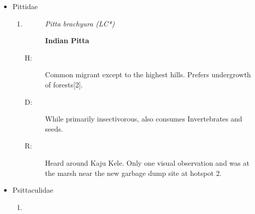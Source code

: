 \begin{itemize}
\begin{enumerate}
\begin{description}
\item[D: ]%
insectivorous woodpecker. Diet consists primarily of ants, beetles, and their larvae. Also known to consume small fruits and nectar.%
\item[R: ]%
Inside Kaju Kele and around the Department of Civil Engineering%
\end{description}%
\item%
\begin{description}%
\item[]%
\textit{Dinopium psarodes (LC)}%
\item[]%
\textbf{Red{-}Backed Flameback}%
\end{description}%
\begin{description}%
\item[H: ]%
Fairly common breeding resident in the southern part of the country. Forests, coconut plantations and trees in open country are the areas where can be easily observed{[}2{]}.%
\item[D: ]%
Primary diet consists of larvae and pupae of ants. Consumes invertebrates such as spiders, caterpillars, weevils, and beetles.%
\item[R: ]%
Kaju kele,Boat yard, wooded areas around the steel building, and Lagaan.%
\end{description}%
\end{enumerate}%
\item%
Pittidae%
\begin{enumerate}%
\item%
\begin{description}%
\item[]%
\textit{Pitta brachyura (LC*)}%
\item[]%
\textbf{Indian Pitta}%
\end{description}%
\begin{description}%
\item[H: ]%
Common migrant except to the highest hills. Prefers undergrowth of forests{[}2{]}.%
\item[D: ]%
While primarily insectivorous, also consumes Invertebrates and seeds.%
\item[R: ]%
Heard around Kaju Kele. Only one visual observation and was at the marsh near the new garbage dump site at hotspot 2.%
\end{description}%
\end{enumerate}%
\item%
Psittaculidae%
\begin{enumerate}%
\item%

\end{enumerate}
\end{itemize}
